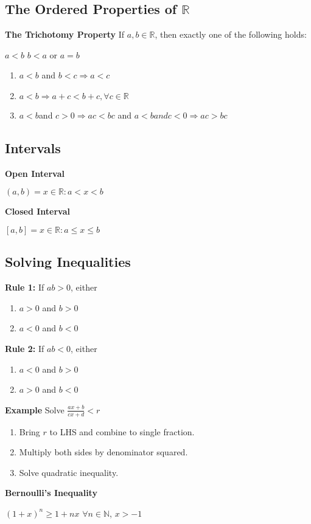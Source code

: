 \documentclass[10pt, twocolumn]{article}
\begin{document}
\subsection{The Ordered Properties of $\mathbb{R}$}
{\bf The Trichotomy Property}
\newline
If $a,b \in \mathbb{R}$, then exactly one of the following holds:
\begin{center}
$a<b$ \hspace{20pt} $b<a$ \hspace{9pt} or \hspace{9pt} $a=b$
\end{center}
\begin{enumerate}
\item[(a)]{$a<b$ and $b<c \Rightarrow a<c$}
\item[(b)]{$a<b \Rightarrow a+c<b+c, \forall c \in \mathbb{R}$}
\item[(c)]{$a<b $and $c>0 \Rightarrow ac<bc$ and $a<b and c<0 \Rightarrow ac>bc$}
\end{enumerate}

\subsection{Intervals}
{\bf Open Interval}
\begin{center}
$(a,b) = {x\in\mathbb{R} : a<x<b}$
\end{center}
{\bf Closed Interval}
\begin{center}
$[a,b] = {x\in\mathbb{R} : a \leq x \leq b}$
\end{center}

\subsection{Solving Inequalities}
{\bf Rule 1:} If $ab>0$, either
\begin{enumerate}
\item[(i)]{$a>0$ and $b>0$}
\item[(ii)]{$a<0$ and $b<0$}
\end{enumerate}
{\bf Rule 2:} If $ab<0$, either
\begin{enumerate}
\item[(i)]{$a<0$ and $b>0$}
\item[(ii)]{$a>0$ and $b<0$}
\end{enumerate}
{\bf Example}
\newline
Solve $\frac{ax+b}{cx+d}<r$
\begin{enumerate}
\item[1.]{Bring $r$ to LHS and combine to single fraction.}
\item[2.]{Multiply both sides by denominator squared.}
\item[3.]{Solve quadratic inequality.}
\end{enumerate}
{\bf Bernoulli's Inequality}
\begin{center}
$(1+x)^n \geq 1+nx$ \hspace{20pt} $\forall n \in \mathbb{N}$, $x>-1$
\end{center}
\end{document}
